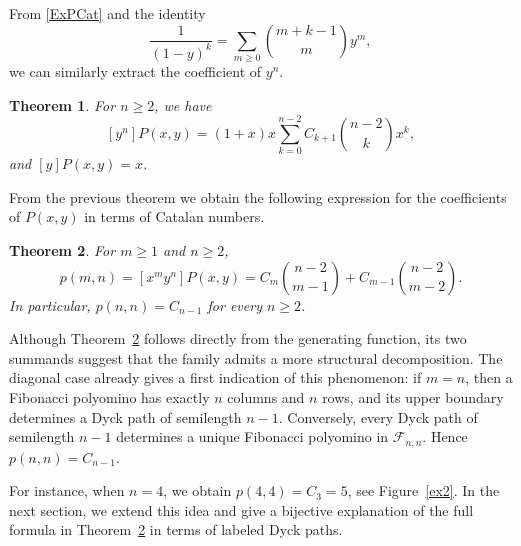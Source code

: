 \documentclass[12pt]{amsart}
\theoremstyle{plain}
\newtheorem{theorem}{Theorem}[section]
\theoremstyle{definition}
\newcommand{\F}{{\mathcal F}}
\begin{document}
From \eqref{ExPCat} and the identity
\[
\frac{1}{(1-y)^k}
=
\sum_{m\geq 0}\binom{m+k-1}{m}y^m,
\]
we can similarly extract the coefficient of $y^n$.

\begin{theorem}
 For $n\geq 2$, we have 
 \[[y^n]P(x,y)=(1+x)x\sum_{k=0}^{n-2}C_{k+1}\binom{n-2}{k}x^k,\]
 and $[y]P(x,y)=x$.  
\end{theorem}



From the previous theorem we obtain the following expression for the coefficients of $P(x,y)$ in terms of Catalan numbers. 

\begin{theorem}\label{thm:perimeter-coefficients}
For $m\geq 1$ and $n\geq 2$,
\[
p(m,n)
=
[x^my^n]P(x,y)
=
C_m\binom{n-2}{m-1}
+
C_{m-1}\binom{n-2}{m-2}.
\]
In particular, $p(n,n)=C_{n-1}$ for every $n\geq 2$.
\end{theorem}

Although Theorem~\ref{thm:perimeter-coefficients} follows directly from
the generating function, its two summands suggest that the family admits
a more structural decomposition. The diagonal case already gives a first
indication of this phenomenon: if $m=n$, then a Fibonacci polyomino has
exactly $n$ columns and $n$ rows, and its upper boundary determines a
Dyck path of semilength $n-1$. Conversely, every Dyck path of semilength
$n-1$ determines a unique Fibonacci polyomino in $\F_{n,n}$. Hence $p(n,n)=C_{n-1}$. 


For instance, when $n=4$, we obtain $p(4,4)=C_3=5$, see Figure~\ref{ex2}. In the next section, we extend this idea and give
a bijective explanation of the full formula in
Theorem~\ref{thm:perimeter-coefficients} in terms of labeled Dyck paths.
\end{document}
